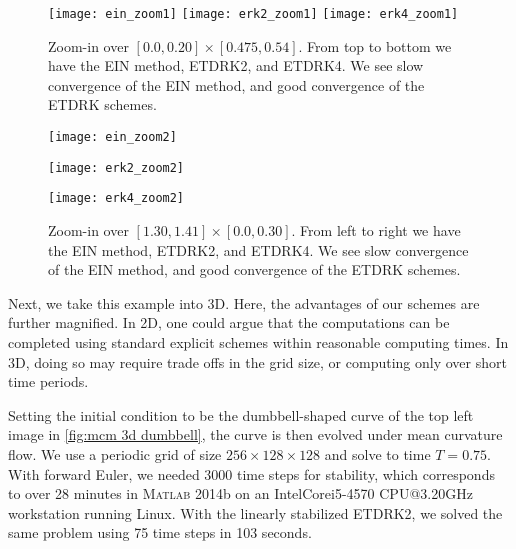 \begin{figure}[htb!]
        \centering
\texttt{[image: ein\_zoom1]}
\texttt{[image: erk2\_zoom1]}
\texttt{[image: erk4\_zoom1]}
\caption[{Zoom-in over $ [0.0,0.20]\times [0.475,0.54]$ to inspect convergence}]{Zoom-in over $[0.0, 0.20]\times [0.475, 0.54]$. From top to bottom we have the EIN method, ETDRK2, and ETDRK4. We see slow convergence of the EIN method, and good convergence of the ETDRK schemes.}
\label{fig:mcm zoom in 1}
\end{figure}

\begin{figure}[htb!]
        \centering
\begin{minipage}{0.30\textwidth}
        \texttt{[image: ein\_zoom2]}
\end{minipage}
\begin{minipage}{0.30\textwidth}
        \texttt{[image: erk2\_zoom2]}
\end{minipage}
\begin{minipage}{0.30\textwidth}
        \texttt{[image: erk4\_zoom2]}
\end{minipage}
\caption[{A zoom-in over $[1.30,1.41]\times [0.0, 0.30]$ to inspect convergence}]{Zoom-in over $[1.30,1.41]\times [0.0, 0.30]$. From left to right we have the EIN method, ETDRK2, and ETDRK4. We see slow convergence of the EIN method, and good convergence of the ETDRK schemes.}
\label{fig:mcm zoom in 2}
\end{figure}

Next, we take this example into 3D. Here, the advantages of our schemes are further magnified. In 2D, one could argue that the computations can be completed using standard explicit schemes within reasonable computing times. In 3D, doing so may require trade offs in the grid size, or computing only over short time periods. 

Setting the initial condition to be the dumbbell-shaped curve of the top left image in \cref{fig:mcm 3d dumbbell}, the curve is then evolved under mean curvature flow. We use a periodic grid of size $256\times 128\times 128$ and solve to time $T=0.75$. With forward Euler, we needed $3000$ time steps for stability, which corresponds to over 28 minutes in \textsc{Matlab} 2014b on an Intel\textsuperscript{\textregistered}Core\textsuperscript{\texttrademark}i5-4570 CPU@3.20GHz workstation running Linux. With the linearly stabilized ETDRK2, we solved the same problem using 75 time steps in 103 seconds.


